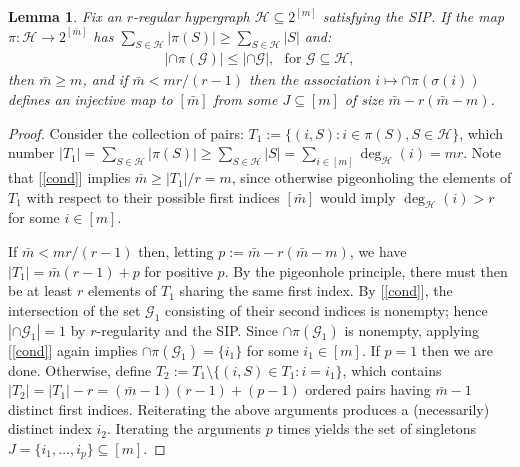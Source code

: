 \documentclass[9pt,twocolumn]{pnas-new}
\newtheorem{lemma}{Lemma}
\renewcommand{\eqref}[1]{\textnormal{[\ref{#1}]}}
\begin{document}
\begin{lemma}\label{NonEmptyLemma} 
Fix an $r$-regular hypergraph $\mathcal{H} \subseteq 2^{[m]}$ satisfying the SIP. If the map $\pi: \mathcal{H} \to 2^{[\bar m]}$ has $\sum_{S \in \mathcal{H}} |\pi(S)| \geq \sum_{S \in \mathcal{H}} |S|$ and:
\begin{align}\label{cond}
|\cap \pi(\mathcal{G})| \leq |\cap \mathcal{G} |,\ \ \   \text{for } \mathcal{G} \subseteq \mathcal{H},
\end{align}
%
then $\bar m \geq m$, and if $\bar m < mr / (r-1)$ then the association $i \mapsto \cap \pi(\sigma(i))$ defines an injective map to $[\bar m]$ from some $J \subseteq [m]$ of size $\bar m - r(\bar m - m)$. %
\end{lemma}

\begin{proof}
Consider the collection of pairs: $T_1 := \{(i, S): i \in \pi(S), S \in \mathcal{H}\}$, which number $|T_1| = \sum_{S \in \mathcal{H}} |\pi(S)| \geq \sum_{S \in \mathcal{H}} |S| = \sum_{i \in [m]} \deg_\mathcal{H}(i) = mr$. Note that \eqref{cond} implies $\bar m \geq |T_1| / r = m$, since otherwise pigeonholing the elements of $T_1$ with respect to their possible first indices $[\bar m]$ would imply $\deg_\mathcal{H}(i) > r$ for some $i \in [m]$.

If $\bar m < mr / (r-1)$ then, letting $p := \bar m - r( \bar m - m)$, we have $|T_1| = \bar m (r - 1) + p$ for positive $p$. By the pigeonhole principle, there must then be at least $r$ elements of $T_1$ sharing the same first index. By \eqref{cond}, the intersection of the set $\mathcal{G}_1$ consisting of their second indices is nonempty; hence $|\cap \mathcal{G}_1| = 1$ by $r$-regularity and the SIP. Since $\cap \pi(\mathcal{G}_1)$ is nonempty, applying \eqref{cond} again implies $\cap \pi(\mathcal{G}_1) = \{i_1\}$ for some $i_1 \in [m]$. If $p=1$ then we are done. Otherwise, define $T_2 := T_1 \setminus \{(i,S) \in T_1: i = i_1\}$, which contains $|T_2| = |T_1| - r = (\bar m - 1)(r-1) + (p-1)$ ordered pairs having $\bar m - 1$ distinct first indices. Reiterating the above arguments produces a (necessarily) distinct index $i_2$. Iterating the arguments $p$ times yields the set of singletons \mbox{$J = \{i_1, \ldots, i_p\} \subseteq [m]$}.
\end{proof}
\end{document}
